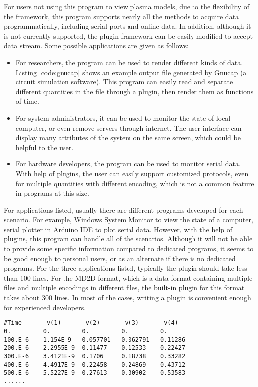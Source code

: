 For users not using this program to view plasma models, due to the flexibility of the framework, this program supports nearly all the methods to acquire data programmatically, including serial ports and online data. In addition, although it is not currently supported, the plugin framework can be easily modified to accept data stream. Some possible applications are given as follows:

\begin{itemize}
	\item For researchers, the program can be used to render different kinds of data. Listing \ref{code:gnucap} shows an example output file generated by Gnucap (a circuit simulation software). This program can easily read and separate different quantities in the file through a plugin, then render them as functions of time.
	\item For system administrators, it can be used to monitor the state of local computer, or even remove servers through internet. The user interface can display many attributes of the system on the same screen, which could be helpful to the user.
	\item For hardware developers, the program can be used to monitor serial data. With help of plugins, the user can easily support customized protocols, even for multiple quantities with different encoding, which is not a common feature in programs at this size.
\end{itemize}

For applications listed, usually there are different programs developed for each scenario. For example, Windows System Monitor to view the state of a computer, serial plotter in Arduino IDE to plot serial data. However, with the help of plugins, this program can handle all of the scenarios. Although it will not be able to provide some specific information compared to dedicated programs, it seems to be good enough to personal users, or as an alternate if there is no dedicated programs. For the three applications listed, typically the plugin should take less than 100 lines. For the MD2D format, which is a data format containing multiple files and multiple encodings in different files, the built-in plugin for this format takes about 300 lines. In most of the cases, writing a plugin is convenient enough for experienced developers.

\begin{lstlisting}[style = mybase, caption = Example output file from Gnucap, label = code:gnucap]
#Time       v(1)       v(2)       v(3)       v(4)
0.         0.         0.         0.         0.
100.E-6    1.154E-9   0.057701   0.062791   0.11286
200.E-6    2.2955E-9  0.11477    0.12533    0.22427
300.E-6    3.4121E-9  0.1706     0.18738    0.33282
400.E-6    4.4917E-9  0.22458    0.24869    0.43712
500.E-6    5.5227E-9  0.27613    0.30902    0.53583
......
\end{lstlisting}

